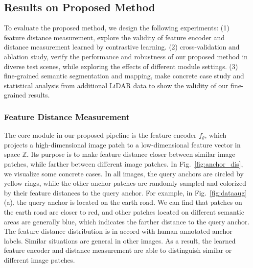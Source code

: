 \documentclass[letterpaper, 10 pt, conference]{ieeeconf}  %
\begin{document}
\subsection{Results on Proposed Method}
To evaluate the proposed method, we design the following experiments: (1) feature distance measurement, explore the validity of feature encoder and distance measurement learned by contrastive learning. (2) cross-validation and ablation study, verify the performance and robustness of our proposed method in diverse test scenes, while exploring the effects of different module settings. (3) fine-grained semantic segmentation and mapping, make concrete case study and statistical analysis from additional LiDAR data to show the validity of our fine-grained results.

\subsubsection{Feature Distance Measurement}
The core module in our proposed pipeline is the feature encoder $f_\theta$, which projects a high-dimensional image patch to a low-dimensional feature vector in space $\mathbb{Z}$. Its purpose is to make feature distance closer between similar image patches, while farther between different image patches. In Fig.~\ref{fig:anchor_dis}, we visualize some concrete cases. In all images, the query anchors are circled by yellow rings, while the other anchor patches are randomly sampled and colorized by their feature distances to the query anchor. For example, in Fig.~\ref{fig:dataaug}(a), the query anchor is located on the earth road. We can find that patches on the earth road are closer to red, and other patches located on different semantic areas are generally blue, which indicates the farther distance to the query anchor. The feature distance distribution is in accord with human-annotated anchor labels. Similar situations are general in other images. As a result, the learned feature encoder and distance measurement are able to distinguish similar or different image patches.
\end{document}
